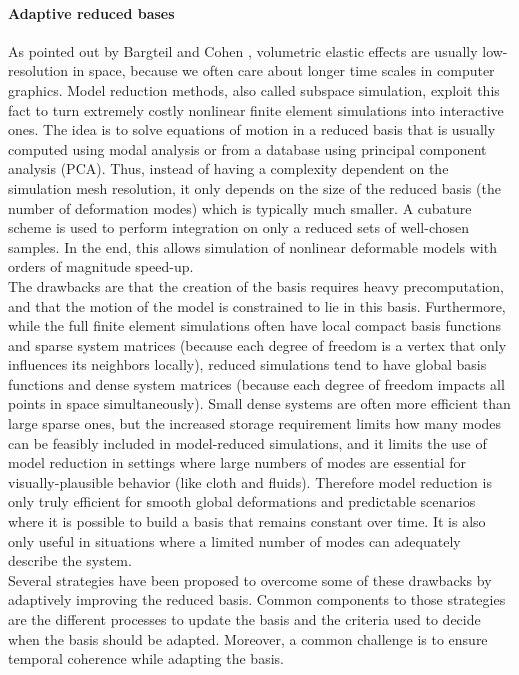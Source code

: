 \paragraph*{Adaptive reduced bases}
As pointed out by Bargteil and Cohen \cite{bargteil2014animation}, volumetric elastic effects are usually low-resolution in space, because we often care about longer time scales in computer graphics.
Model reduction methods, also called subspace simulation, exploit this fact to turn extremely costly nonlinear finite element simulations into interactive ones.
The idea is to solve equations of motion in a reduced basis that is usually computed using modal analysis or from a database using principal component analysis (PCA).
Thus, instead of having a complexity dependent on the simulation mesh resolution, it only depends on the size of the reduced basis (the number of deformation modes) which is typically much smaller.
A cubature scheme is used to perform integration on only a reduced sets of well-chosen samples. In the end, this allows simulation of nonlinear deformable models with orders of magnitude speed-up.
\\
The drawbacks are that the creation of the basis requires heavy precomputation, and that the motion of the model is constrained to lie in this basis. Furthermore, while the full finite element simulations often have local compact basis functions and sparse system matrices (because each degree of freedom is a vertex that only influences its neighbors locally), reduced simulations tend to have global basis functions and dense system matrices (because each degree of freedom impacts all points in space simultaneously). Small dense systems are often more efficient than large sparse ones, but the increased storage requirement limits how many modes can be feasibly included in model-reduced simulations, and it limits the use of model reduction in settings where large numbers of modes are essential for visually-plausible behavior (like cloth and fluids).
Therefore model reduction is only truly efficient for smooth global deformations and predictable scenarios where it is possible to build a basis that remains constant over time. It is also only useful in situations where a limited number of modes can adequately describe the system.
\\
Several strategies have been proposed to overcome some of these drawbacks by adaptively improving the reduced basis. Common components to those strategies are the different processes to update the basis and the criteria used to decide when the basis should be adapted. Moreover, a common challenge is to ensure temporal coherence while adapting the basis.

